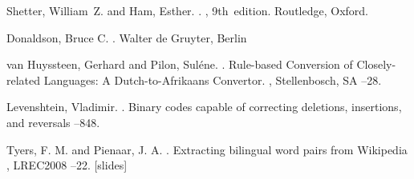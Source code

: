 \documentclass[11pt]{article}
\begin{document}
\begin{thebibliography}{}

Shetter, William~Z. and Ham, Esther.
.
, 9th~edition.
\newblock Routledge, Oxford.

Donaldson, Bruce C.
.
\newblock Walter de Gruyter, Berlin

van Huyssteen, Gerhard and Pilon, Suléne.
. 
\newblock Rule-based Conversion of Closely-related Languages: A Dutch-to-Afrikaans Convertor. 
, Stellenbosch, SA
--28.

Levenshtein, Vladimir.
. 
\newblock Binary codes capable of correcting deletions, insertions, and reversals
--848.

Tyers, F. M. and Pienaar, J. A.
. 
\newblock Extracting bilingual word pairs from Wikipedia
, LREC2008
--22. [slides]


\end{thebibliography}
\end{document}

